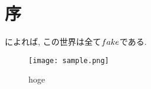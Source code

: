 \documentclass[../main]{subfiles}
\begin{document}
\section{序}

\cite{non-non}によれば, この世界は全て$fake$である.

\begin{figure}[htbp]
    \begin{center}
        \texttt{[image: sample.png]}
        \caption{hoge}
    \end{center}
\end{figure}
\end{document}
